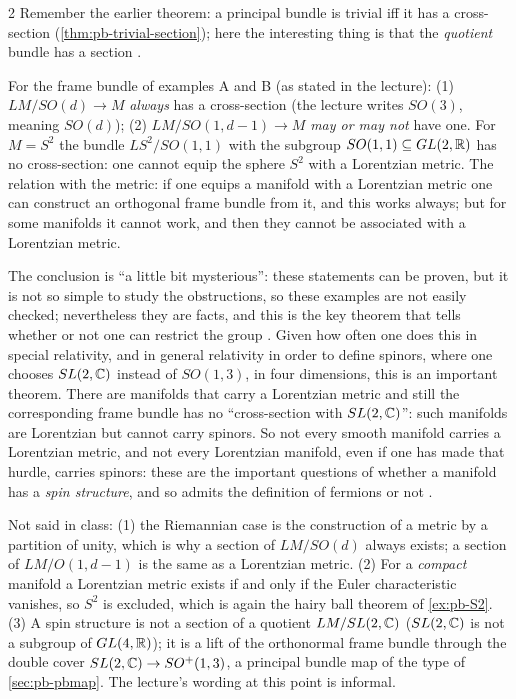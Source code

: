 \begin{paracol}{2}
Remember the earlier theorem: a principal bundle is trivial iff it has a cross-section (\cref{thm:pb-trivial-section}); here the interesting thing is that the \emph{quotient} bundle has a section  .
\begin{example}\label{ex:ab-metric}
For the frame bundle of examples A and B (as stated in the lecture): (1) $LM/SO(d)\to M$ \emph{always} has a cross-section (the lecture writes $SO(3)$, meaning $SO(d)$); (2) $LM/SO(1,d-1)\to M$ \emph{may or may not} have one. For $M=S^2$ the bundle $LS^2/SO(1,1)$ with the subgroup $SO(1,1)\subseteq GL(2,\mathbb{R})$ has no cross-section: one cannot equip the sphere $S^2$ with a Lorentzian metric. The relation with the metric: if one equips a manifold with a Lorentzian metric one can construct an orthogonal frame bundle from it, and this works always; but for some manifolds it cannot work, and then they cannot be associated with a Lorentzian metric.        
\end{example}
The conclusion is ``a little bit mysterious'': these statements can be proven, but it is not so simple to study the obstructions, so these examples are not easily checked; nevertheless they are facts, and this is the key theorem that tells whether or not one can restrict the group  . Given how often one does this in special relativity, and in general relativity in order to define spinors, where one chooses $SL(2,\mathbb{C})$ instead of $SO(1,3)$, in four dimensions, this is an important theorem. There are manifolds that carry a Lorentzian metric and still the corresponding frame bundle has no ``cross-section with $SL(2,\mathbb{C})$'': such manifolds are Lorentzian but cannot carry spinors. So not every smooth manifold carries a Lorentzian metric, and not every Lorentzian manifold, even if one has made that hurdle, carries spinors: these are the important questions of whether a manifold has a \emph{spin structure}, and so admits the definition of fermions or not   .
\begin{coursenote}
Not said in class: (1) the Riemannian case is the construction of a metric by a partition of unity, which is why a section of $LM/SO(d)$ always exists; a section of $LM/O(1,d-1)$ is the same as a Lorentzian metric. (2) For a \emph{compact} manifold a Lorentzian metric exists if and only if the Euler characteristic vanishes, so $S^2$ is excluded, which is again the hairy ball theorem of \cref{ex:pb-S2}. (3) A spin structure is not a section of a quotient $LM/SL(2,\mathbb{C})$ ($SL(2,\mathbb{C})$ is not a subgroup of $GL(4,\mathbb{R})$); it is a lift of the orthonormal frame bundle through the double cover $SL(2,\mathbb{C})\to SO^+(1,3)$, a principal bundle map of the type of \cref{sec:pb-pbmap}. The lecture's wording at this point is informal. 
\end{coursenote}


\end{paracol}
